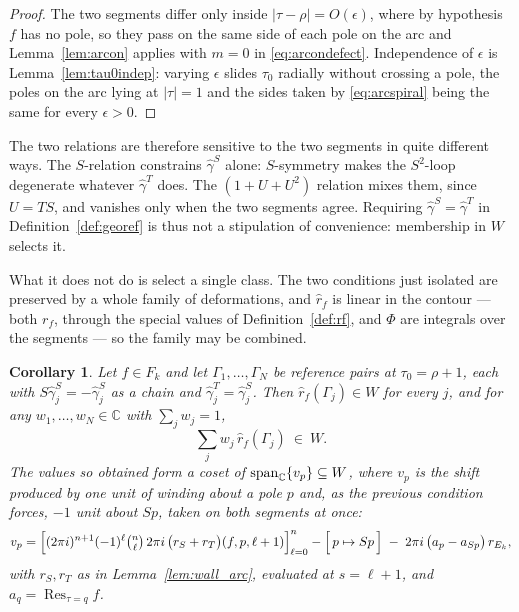 \documentclass[11pt]{article}
\newtheorem{corollary}[theorem]{Corollary}
\newcommand{\CC}{\mathbb{C}}
\DeclareMathOperator{\Res}{Res}
\begin{document}
\begin{proof}
The two segments differ only inside $|\tau-\rho|=O(\epsilon)$, where by hypothesis $f$ has no
pole, so they pass on the same side of each pole on the arc and Lemma~\ref{lem:arcon} applies with
$m=0$ in \eqref{eq:arcondefect}. Independence of $\epsilon$ is Lemma~\ref{lem:tau0indep}: varying
$\epsilon$ slides $\tau_0$ radially without crossing a pole, the poles on the arc lying at
$|\tau|=1$ and the sides taken by \eqref{eq:arcspiral} being the same for every $\epsilon>0$.
\end{proof}

The two relations are therefore sensitive to the two segments in quite different ways. The
$S$-relation constrains $\hat\gamma^S$ alone: $S$-symmetry makes the $S^2$-loop degenerate whatever
$\hat\gamma^T$ does. The $(1+U+U^2)$ relation mixes them, since $U=TS$, and vanishes only when the
two segments agree. Requiring $\hat\gamma^S=\hat\gamma^T$ in Definition~\ref{def:georef} is thus not
a stipulation of convenience: membership in $W$ selects it.

What it does not do is select a single class. The two conditions just isolated are preserved by a
whole family of deformations, and $\hat r_f$ is linear in the contour --- both $r_f$, through the
special values of Definition~\ref{def:rf}, and $\Phi$ are integrals over the segments --- so the
family may be combined.

\begin{corollary}\label{cor:symspan}
Let $f\in F_k$ and let $\Gamma_1,\dots,\Gamma_N$ be reference pairs at $\tau_0=\rho+1$, each with
$S\hat\gamma^S_j=-\hat\gamma^S_j$ as a chain and $\hat\gamma^T_j=\hat\gamma^S_j$. Then
$\hat r_f(\Gamma_j)\in W$ for every $j$, and for any $w_1,\dots,w_N\in\CC$ with $\sum_jw_j=1$,
\begin{equation}\label{eq:symspan}
\sum_{j}w_j\,\hat r_f(\Gamma_j)\ \in\ W .
\end{equation}
The values so obtained form a coset of ${\rm span}_\CC\{v_p\}\subseteq W$, where $v_p$ is the
shift produced by one unit of winding about a pole $p$ and, as the previous condition forces,
$-1$ unit about $Sp$, taken on both segments at once:
\begin{equation}\label{eq:symshift}
v_p=\Big[(2\pi i)^{n+1}(-1)^{\ell}\tbinom{n}{\ell}\,2\pi i\,
\big(r_S+r_T\big)(f,p,\ell+1)\Big]_{\ell=0}^{n}
-\Big[\,p\mapsto Sp\,\Big]\;-\;2\pi i\,\big(a_p-a_{Sp}\big)\,r_{E_k},
\end{equation}
with $r_S,r_T$ as in Lemma~\ref{lem:wall_arc}, evaluated at $s=\ell+1$, and $a_q=\Res_{\tau=q}f$.
\end{corollary}
\end{document}
